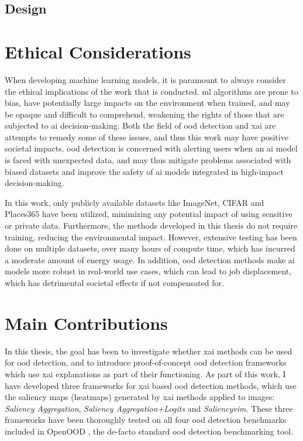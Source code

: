 \documentclass[UKenglish]{uiomasterthesis} %
\theoremstyle{definition}
\begin{document}
\subsection{Design}

\section{Ethical Considerations}

When developing machine learning models, it is paramount to always consider the ethical implications of the work that is conducted. \ac{ml} algorithms are prone to bias, have potentially large impacts on the environment when trained, and may be opaque and difficult to comprehend, weakening the rights of those that are subjected to \ac{ai} decision-making. Both the field of \ac{ood} detection and \ac{xai} are attempts to remedy some of these issues, and thus this work may have positive societal impacts. \ac{ood} detection is concerned with alerting users when an \ac{ai} model is faced with unexpected data, and may thus mitigate problems associated with biased datasets and improve the safety of \ac{ai} models integrated in high-impact decision-making. 

In this work, only publicly available datasets like ImageNet, CIFAR and Places365 have been utilized, minimizing any potential impact of using sensitive or private data. Furthermore, the methods developed in this thesis do not require training, reducing the environmental impact. However, extensive testing has been done on multiple datasets, over many hours of compute time, which has incurred a moderate amount of energy usage. In addition, \ac{ood} detection methods make \ac{ai} models more robust in real-world use cases, which can lead to job displacement, which has detrimental societal effects if not compensated for.

\section{Main Contributions}

In this thesis, the goal has been to investigate whether \ac{xai} methods can be used for \ac{ood} detection, and to introduce proof-of-concept \ac{ood} detection frameworks which use \ac{xai} explanations as part of their functioning. As part of this work, I have developed three frameworks for \ac{xai} based \ac{ood} detection methods, which use the saliency maps (heatmaps) generated by \ac{xai} methods applied to images: {\it Saliency Aggregation}, {\it Saliency Aggregation+Logits} and {\it Saliency\acs*{vim}}. These three frameworks have been thoroughly tested on all four \ac{ood} detection benchmarks included in OpenOOD \cite{openood, openood15}, the de-facto standard \ac{ood} detection benchmarking tool.
\end{document}
